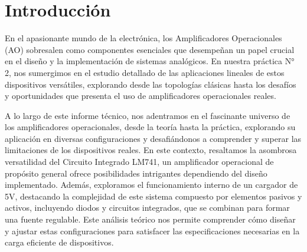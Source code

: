 
\section{Introducción}
En el apasionante mundo de la electrónica, los Amplificadores Operacionales (AO) sobresalen como componentes esenciales que desempeñan un papel crucial en el diseño y la implementación de sistemas analógicos. En nuestra práctica N° 2, nos sumergimos en el estudio detallado de las aplicaciones lineales de estos dispositivos versátiles, explorando desde las topologías clásicas hasta los desafíos y oportunidades que presenta el uso de amplificadores operacionales reales.

A lo largo de este informe técnico, nos adentramos en el fascinante universo de los amplificadores operacionales, desde la teoría hasta la práctica, explorando su aplicación en diversas configuraciones y desafiándonos a comprender y superar las limitaciones de los dispositivos reales. En este contexto, resaltamos la asombrosa versatilidad del Circuito Integrado LM741, un amplificador operacional de propósito general ofrece posibilidades intrigantes dependiendo del diseño implementado. Además, exploramos el funcionamiento interno de un cargador de 5V, destacando la complejidad de este sistema compuesto por elementos pasivos y activos, incluyendo diodos y circuitos integrados, que se combinan para formar una fuente regulable. Este análisis teórico nos permite comprender cómo diseñar y ajustar estas configuraciones para satisfacer las especificaciones necesarias en la carga eficiente de dispositivos.

\newpage